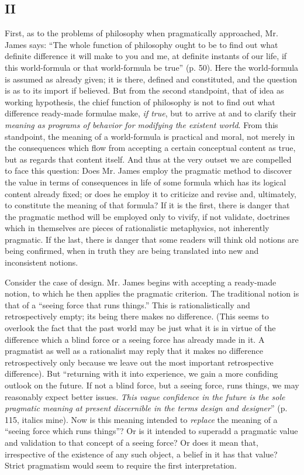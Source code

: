\documentclass[12pt]{article}
\begin{document}
\subsection*{II}
First, as to the problems of philosophy when pragmatically approached,
Mr. James says: ``The whole function of philosophy ought to be to find
out what definite difference it will make to you and me, at definite
instants of our life, if this world-formula or that world-formula be
true'' (p. 50). Here the world-formula is assumed as already given; it
is there, defined and constituted, and the question is as to its
import if believed. But from the second standpoint, that of idea as
working hypothesis, the chief function of philosophy is not to find
out what difference ready-made formulae make, \emph{if true}, but to
arrive at and to clarify their \emph{meaning as programs of behavior for
modifying the existent world}. From this standpoint, the meaning of a
world-formula is practical and moral, not merely in the consequences
which flow from accepting a certain conceptual content as true, but as
regards that content itself. And thus at the very outset we are
compelled to face this question: Does Mr. James employ the pragmatic
method to discover the value in terms of consequences in life of some
formula which has its logical content already fixed; or does he employ
it to criticize and revise and, ultimately, to constitute the meaning
of that formula? If it is the first, there is danger that the
pragmatic method will be employed only to vivify, if not validate,
doctrines which in themselves are pieces of rationalistic metaphysics,
not inherently pragmatic. If the last, there is danger that some
readers will think old notions are being confirmed, when in truth they
are being translated into new and inconsistent notions.


Consider the case of design. Mr. James begins with accepting a
ready-made notion, to which he then applies the pragmatic criterion.
The traditional notion is that of a ``seeing force that runs things.''
This is rationalistically and retrospectively empty; its being there
makes no difference. (This seems to overlook the fact that the past
world may be just what it is in virtue of the difference which a blind
force or a seeing force has already made in it. A pragmatist as well
as a rationalist may reply that it makes no difference retrospectively
only because we leave out the most important retrospective
difference). But ``returning with it into experience, we gain a more
confiding outlook on the future. If not a blind force, but a seeing
force, runs things, we may reasonably expect better issues. \emph{This
vague confidence in the future is the sole pragmatic meaning at
present discernible in the terms design and designer}'' (p. 115,
italics mine). Now is this meaning intended to \emph{replace} the meaning
of a ``seeing force which runs things''? Or is it intended to superadd a
pragmatic value and validation to that concept of a seeing force? Or
does it mean that, irrespective of the existence of any such object, a
belief in it has that value? Strict pragmatism would seem to require
the first interpretation.
\end{document}
